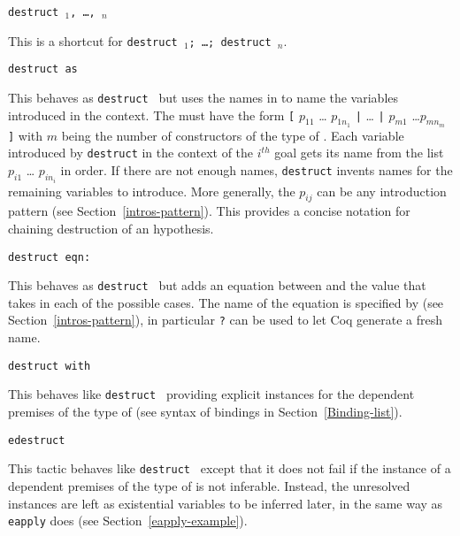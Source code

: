 \begin{coq_example*}
\begin{itemize}
\end{itemize}

\begin{Variants}
\item{\tt destruct \term$_1$, \ldots, \term$_n$}

  This is a shortcut for {\tt destruct \term$_1$; \ldots; destruct \term$_n$}.

\item{\tt destruct {\term} as {\disjconjintropattern}}

  This behaves as {\tt destruct {\term}} but uses the names in
  {\intropattern} to name the variables introduced in the context.
  The {\intropattern} must have the form {\tt [} $p_{11}$ \ldots
    $p_{1n_1}$ {\tt |} {\ldots} {\tt |} $p_{m1}$ \ldots $p_{mn_m}$
    {\tt ]} with $m$ being the number of constructors of the type of
  {\term}. Each variable introduced by {\tt destruct} in the context
  of the $i^{th}$ goal gets its name from the list $p_{i1}$ \ldots
  $p_{in_i}$ in order. If there are not enough names, {\tt destruct}
  invents names for the remaining variables to introduce. More
  generally, the $p_{ij}$ can be any introduction pattern (see
  Section~\ref{intros-pattern}). This provides a concise notation for
  chaining destruction of an hypothesis.


\item{\tt destruct {\term} eqn:{\namingintropattern}}

  This behaves as {\tt destruct {\term}} but adds an equation between
  {\term} and the value that {\term} takes in each of the possible
  cases.  The name of the equation is specified by {\namingintropattern}
  (see Section~\ref{intros-pattern}), in particular {\tt ?} can be
  used to let Coq generate a fresh name.

\item{\tt destruct {\term} with \bindinglist}

  This behaves like \texttt{destruct {\term}} providing explicit
  instances for the dependent premises of the type of {\term} (see
  syntax of bindings in Section~\ref{Binding-list}).

\item{\tt edestruct {\term}}

  This tactic behaves like \texttt{destruct {\term}} except that it
  does not fail if the instance of a dependent premises of the type of
  {\term} is not inferable. Instead, the unresolved instances are left
  as existential variables to be inferred later, in the same way as
  {\tt eapply} does (see Section~\ref{eapply-example}).


\end{Variants}
\end{coq_example*}

